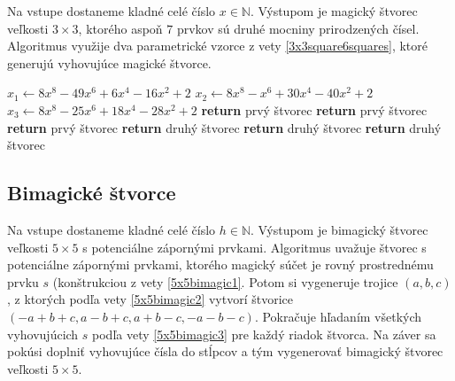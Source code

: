 \begin{subalg} Na vstupe dostaneme kladné celé číslo $x \in \mathbb{N}$. Výstupom je magický štvorec veľkosti $3 \times 3$, ktorého aspoň $7$ prvkov sú druhé mocniny prirodzených čísel. Algoritmus využije dva parametrické vzorce z vety \ref{3x3square6squares}, ktoré generujú vyhovujúce magické štvorce.
\end{subalg}

\begin{algorithmic}
\STATE $x_1 \gets 8x^8 - 49x^6 + 6x^4 - 16x^2 + 2$
\STATE $x_2 \gets 8x^8 - x^6 + 30x^4 - 40x^2 + 2$
\STATE $x_3 \gets 8x^8 - 25x^6 + 18x^4 - 28x^2 + 2$
    \STATE \textbf{return} prvý štvorec
\ENDIF
{}
    \STATE \textbf{return} prvý štvorec
\ENDIF
{}
    \STATE \textbf{return} prvý štvorec
\ENDIF
{}
    \STATE \textbf{return} druhý štvorec
\ENDIF
{}
    \STATE \textbf{return} druhý štvorec
\ENDIF
{}
    \STATE \textbf{return} druhý štvorec
\ENDIF
\end{algorithmic}

\subsection{Bimagické štvorce}

\begin{subalg} Na vstupe dostaneme kladné celé číslo $h \in \mathbb{N}$. Výstupom je bimagický štvorec veľkosti $5 \times 5$ s potenciálne zápornými prvkami. Algoritmus uvažuje štvorec s potenciálne zápornými prvkami, ktorého magický súčet je rovný prostrednému prvku $s$ (konštrukciou z vety \ref{5x5bimagic1}. Potom si vygeneruje trojice $(a,b,c)$, z ktorých podľa vety \ref{5x5bimagic2} vytvorí štvorice $(-a+b+c, a-b+c, a+b-c, -a-b-c)$. Pokračuje hľadaním všetkých vyhovujúcich $s$ podľa vety \ref{5x5bimagic3} pre každý riadok štvorca. Na záver sa pokúsi doplniť vyhovujúce čísla do stĺpcov a tým vygenerovať bimagický štvorec veľkosti $5 \times 5$.
\end{subalg}

